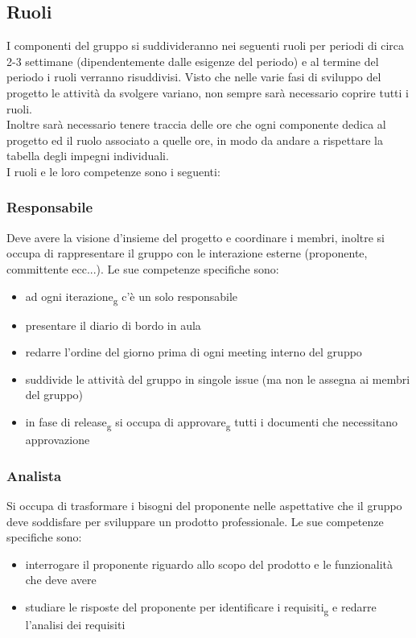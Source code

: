 \subsection{Ruoli}
I componenti del gruppo si suddivideranno nei seguenti ruoli per periodi di circa 2-3 settimane (dipendentemente dalle esigenze del periodo) e al termine del periodo i ruoli verranno risuddivisi. 
Visto che nelle varie fasi di sviluppo del progetto le attività da svolgere variano, non sempre sarà necessario coprire tutti i ruoli.\\
Inoltre sarà necessario tenere traccia delle ore che ogni componente dedica al progetto ed il ruolo associato a quelle ore, in modo da andare a rispettare la tabella degli impegni individuali.\\
I ruoli e le loro competenze sono i seguenti:

\subsubsection{Responsabile}
Deve avere la visione d'insieme del progetto e coordinare i membri, inoltre si occupa di rappresentare il gruppo con le interazione esterne (proponente, committente ecc...). Le sue competenze specifiche sono:
\begin{itemize}
	\item ad ogni iterazione\textsubscript{g} c'è un solo responsabile
	\item presentare il diario di bordo in aula
	\item redarre l'ordine del giorno prima di ogni meeting interno del gruppo
	\item suddivide le attività del gruppo in singole issue (ma non le assegna ai membri del gruppo)
	\item in fase di release\textsubscript{g} si occupa di approvare\textsubscript{g} tutti i documenti che necessitano approvazione
\end{itemize}

\subsubsection{Analista}
Si occupa di trasformare i bisogni del proponente nelle aspettative che il gruppo deve soddisfare per sviluppare un prodotto professionale. Le sue competenze specifiche sono:
\begin{itemize}
	\item interrogare il proponente riguardo allo scopo del prodotto e le funzionalità che deve avere
	\item studiare le risposte del proponente per identificare i requisiti\textsubscript{g} e redarre l'analisi dei requisiti
\end{itemize}

